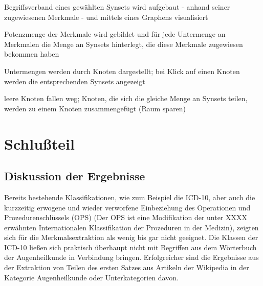 \documentclass[pagesize,DIV=calc,12pt,draft]{scrreprt}
\begin{document}
\begin{inparaenum}
\item Begriffsverband eines gewählten Synsets wird aufgebaut - anhand seiner zugewiesenen Merkmale - und mittels eines Graphens visualisiert

\item Potenzmenge der Merkmale wird gebildet und für jede Untermenge an Merkmalen die Menge an Synsets hinterlegt, die diese Merkmale zugewiesen bekommen haben

\item Untermengen werden durch Knoten dargestellt; bei Klick auf einen Knoten werden die entsprechenden Synsets angezeigt

\item leere Knoten fallen weg; Knoten, die sich die gleiche Menge an Synsets teilen, werden zu einem Knoten zusammengefügt (Raum sparen)
\end{inparaenum}

\chapter{Schlußteil}

\section{Diskussion der Ergebnisse}

Bereits bestehende Klassifikationen, wie zum Beispiel die ICD-10, aber auch die kurzzeitig erwogene und wieder verworfene Einbeziehung des Operationen und Prozedurenschlüssels (OPS) (Der OPS ist eine Modifikation der unter XXXX erwähnten Internationalen Klassifikation der Prozeduren in der Medizin), zeigten sich für die Merkmalsextraktion als wenig bis gar nicht geeignet. 
Die Klassen der ICD-10 ließen sich praktisch überhaupt nicht mit Begriffen aus dem Wörterbuch der Augenheilkunde in Verbindung bringen. 
Erfolgreicher sind die Ergebnisse aus der Extraktion von Teilen des ersten Satzes aus Artikeln der Wikipedia in der Kategorie Augenheilkunde oder Unterkategorien davon. 
\end{document}
